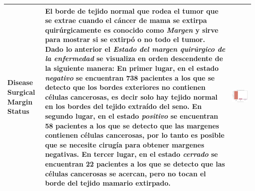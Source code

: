\begin{table}[!htb]
	\footnotesize
	\begin{threeparttable}
		\begin{tabular}{p{2.5cm} p{7.5cm} p{6.5cm}} \toprule
					
			Disease Surgical Margin Status
			& El borde de tejido normal que rodea el tumor que se extrae cuando el cáncer de mama se extirpa quirúrgicamente es conocido como \textit{Margen} y sirve para mostrar si se extirpó o no todo el tumor\cite{Susan}. Dado lo anterior el \textit{Estado del margen quirúrgico de la enfermedad} se visualiza en orden descendente de la siguiente manera: En primer lugar, en el estado \textit{negativo} se encuentran 738 pacientes a los que se detecto que los bordes exteriores no contienen células cancerosas, es decir solo hay tejido normal en los bordes del tejido extraído del seno. En segundo lugar, en el estado \textit{positivo} se encuentran 58 pacientes a los que se detecto que las margenes contienen células cancerosas, por lo tanto es posible que se necesite cirugía para obtener margenes negativas. En tercer lugar, en el estado \textit{cerrado} se encuentran 22 pacientes a los que se detecto que las células cancerosas se acercan, pero no tocan el borde del tejido mamario extirpado.
			& \begin{center}\includegraphics[width=1\linewidth]{NOTEBOOK/IMAGENES_DESCRIPTIVAS/34_disease_surgical_margin_status}\end{center}
			\\ \hline
			

\end{tabular}
\end{threeparttable}
\end{table}
